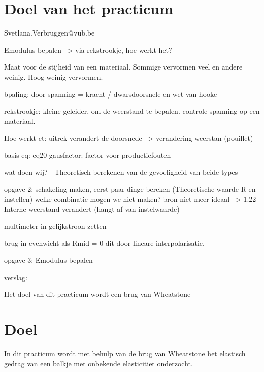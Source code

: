 \section{Doel van het practicum}

Svetlana.Verbruggen@vub.be

Emodulus bepalen
--> via rekstrookje, hoe werkt het?

Maat voor de stijheid van een materiaal. Sommige vervormen veel en andere weinig. Hoog weinig vervormen.

bpaling: door spanning = kracht / dwarsdoorsnele en wet van hooke

rekstrookje: kleine geleider, om de weerstand te bepalen. controle spanning op een materiaal.

Hoe werkt et: uitrek verandert de doorsnede --> verandering weerstan (pouillet)

basis eq: eq20
gausfactor: factor voor productiefouten

wat doen wij?
- Theoretisch berekenen van de gevoeligheid van beide types

opgave 2: schakeling maken, eerst paar dinge bereken (Theoretische waarde R en instellen)
welke combinatie mogen we niet maken?
bron niet meer ideaal --> 1.22
Interne weerstand verandert (hangt af van instelwaarde)

multimeter in gelijkstroon zetten

brug in evenwicht als Rmid = 0
dit door lineare interpolarisatie.

opgave 3: Emodulus bepalen

verslag:

Het doel van dit practicum wordt een brug van Wheatstone


\section{Doel}

In dit practicum wordt met behulp van de brug van Wheatstone
het elastisch gedrag van een balkje met onbekende elasticitiet
onderzocht.
